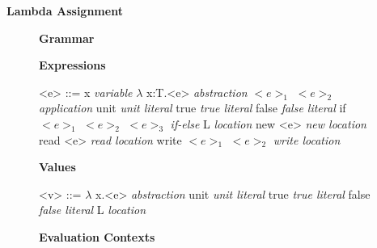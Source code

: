 \documentclass[11pt,oneside]{book}
\newcommand{\synlabel}[1]{\hfill \textit{#1}}
\begin{document}
\frontmatter

\mainmatter

\pagebreak

\begin{center}
    {
        \bf
        \huge
        Lambda Assignment
    }
\end{center}

\begin{figure}[!hp]
\begin{center}
{
    \bf
    \huge
    Grammar
}
\end{center}


\setlength{\grammarindent}{10em} %

\setlength{\grammarparsep}{5pt} %

\textbf{Expressions}

\begin{grammar}

    <e> ::=  x                            \synlabel{variable}
        \alt $\lambda$ x:T.<e>            \synlabel{abstraction}
        \alt $<e>_1$ $<e>_2$              \synlabel{application}
        \alt unit                         \synlabel{unit literal}
        \alt true                         \synlabel{true literal}
        \alt false                        \synlabel{false literal}
        \alt if $<e>_1$ $<e>_2$ $<e>_3$   \synlabel{if-else}
        \alt L                            \synlabel{location}
        \alt new <e>                      \synlabel{new location}
        \alt read <e>                     \synlabel{read location}
        \alt write $<e>_1$ $<e>_2$        \synlabel{write location}

\end{grammar}

\textbf{Values}

\begin{grammar}

    <v> ::=  $\lambda$ x.<e>            \synlabel{abstraction}
        \alt unit                       \synlabel{unit literal}
        \alt true                       \synlabel{true literal}
        \alt false                      \synlabel{false literal}
        \alt L                          \synlabel{location}

\end{grammar}

\textbf{Evaluation Contexts}


\end{figure}
\end{document}
